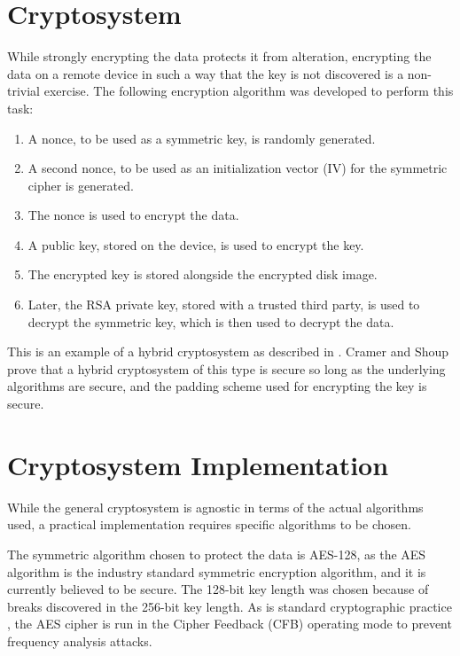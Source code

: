 \section{Cryptosystem}

While strongly encrypting the data protects it from alteration, encrypting the data on a remote device in such
a way that the key is not discovered is a non-trivial exercise. The following encryption algorithm was developed
to perform this task:

\begin{enumerate}
  \item A nonce, to be used as a symmetric key, is randomly generated.
  \item A second nonce, to be used as an initialization vector (IV) for the symmetric cipher is generated.
  \item The nonce is used to encrypt the data.
  \item A public key, stored on the device, is used to encrypt the key.
  \item The encrypted key is stored alongside the encrypted disk image.
  \item Later, the RSA private key, stored with a trusted third party, is
        used to decrypt the symmetric key, which is then used to decrypt
        the data.
\end{enumerate}

This is an example of a hybrid cryptosystem as described in \cite{cramer2004}. Cramer and Shoup prove that a hybrid cryptosystem of
this type is secure so long as the underlying algorithms are secure, and the padding scheme used for encrypting the key is secure.

\section{Cryptosystem Implementation}

While the general cryptosystem is agnostic in terms of the actual algorithms used, a practical implementation requires specific
algorithms to be chosen.

The symmetric algorithm chosen to protect the data is AES-128, as the AES algorithm is the industry standard symmetric encryption
algorithm, and it is currently believed to be secure. The 128-bit key length was chosen because of breaks discovered in the 256-bit
key length\cite{Biryukov2009}. As is standard cryptographic practice \cite{NISTSP80038A}, the AES cipher is run in the Cipher Feedback (CFB)
operating mode to prevent frequency analysis attacks.

